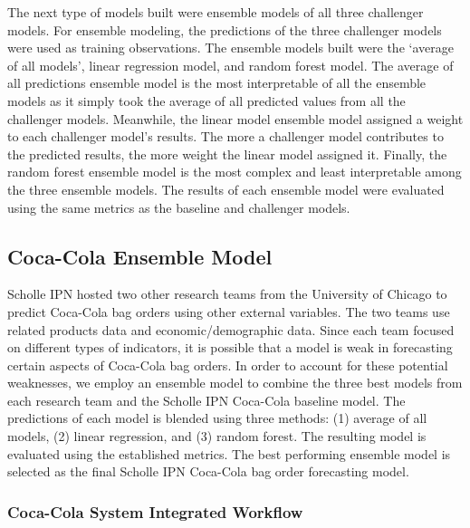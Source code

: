 \documentclass[12pt,oneside]{chicagocapstone}
\begin{document}
The next type of models built were ensemble models of all three challenger models. For ensemble modeling, the predictions of the three challenger models were used as training observations. The ensemble models built were the `average of all models', linear regression model, and random forest model. The average of all predictions ensemble model is the most interpretable of all the ensemble models as it simply took the average of all predicted values from all the challenger models. Meanwhile, the linear model ensemble model assigned a weight to each challenger model's results. The more a challenger model contributes to the predicted results, the more weight the linear model assigned it. Finally, the random forest ensemble model is the most complex and least interpretable among the three ensemble models. The results of each ensemble model were evaluated using the same metrics as the baseline and challenger models.

\hypertarget{coca-cola-ensemble-model}{%
\subsection*{Coca-Cola Ensemble Model}\label{coca-cola-ensemble-model}}

Scholle IPN hosted two other research teams from the University of Chicago to predict Coca-Cola bag orders using other external variables. The two teams use related products data and economic/demographic data. Since each team focused on different types of indicators, it is possible that a model is weak in forecasting certain aspects of Coca-Cola bag orders. In order to account for these potential weaknesses, we employ an ensemble model to combine the three best models from each research team and the Scholle IPN Coca-Cola baseline model. The predictions of each model is blended using three methods: (1) average of all models, (2) linear regression, and (3) random forest. The resulting model is evaluated using the established metrics. The best performing ensemble model is selected as the final Scholle IPN Coca-Cola bag order forecasting model.

\hypertarget{coca-cola-system-integrated-workflow}{%
\subsubsection*{Coca-Cola System Integrated Workflow}\label{coca-cola-system-integrated-workflow}}
\end{document}
